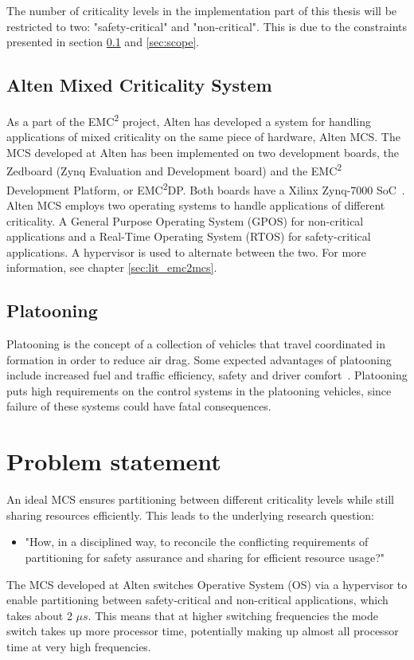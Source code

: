 The number of criticality levels in the implementation part of this thesis will be restricted to two: "safety-critical" and "non-critical". This is due to the constraints presented in section \ref{sec:mces} and \ref{sec:scope}.

\subsection{Alten Mixed Criticality System}
\label{sec:mces}
As a part of the EMC\textsuperscript{2} project, Alten has developed a system for handling applications of mixed criticality on the same piece of hardware, Alten MCS. The MCS developed at Alten has been implemented on two development boards, the Zedboard (Zynq Evaluation and Development board) and the EMC\textsuperscript{2} Development Platform, or EMC\textsuperscript{2}DP. Both boards have a Xilinx Zynq-7000 SoC~\cite{website:xilinx}. Alten MCS employs two operating systems to handle applications of different criticality. A General Purpose Operating System (GPOS) for non-critical applications and a Real-Time Operating System (RTOS) for safety-critical applications. A hypervisor is used to alternate between the two. For more information, see chapter \ref{sec:lit_emc2mcs}.

\subsection{Platooning}
\label{sec:platooning}
Platooning is the concept of a collection of vehicles that travel coordinated in formation in order to reduce air drag. Some expected advantages of platooning include increased fuel and traffic efficiency, safety and driver comfort~\cite{bergenhem}. Platooning puts high requirements on the control systems in the platooning vehicles, since failure of these systems could have fatal consequences.

\section{Problem statement}
\label{sec:problem}
An ideal MCS ensures partitioning between different criticality levels while still sharing resources efficiently. This leads to the underlying research question:
\begin{itemize}
\item "How, in a disciplined way, to reconcile the conflicting requirements of partitioning for safety assurance and sharing for efficient resource usage?" \cite{burns2016}
\end{itemize}
The MCS developed at Alten switches Operative System (OS) via a hypervisor to enable partitioning between safety-critical and non-critical applications, which takes about 2 $\mu s$. This means that at higher switching frequencies the mode switch takes up more processor time, potentially making up almost all processor time at very high frequencies.\\ %

